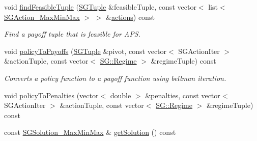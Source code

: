 \begin{DoxyCompactItemize}
\item 
\mbox{\label{classSGSolver__MaxMinMax_ae6d741e78d80171428a81e9933ebf76f}} 
void \hyperlink{classSGSolver__MaxMinMax_ae6d741e78d80171428a81e9933ebf76f}{find\+Feasible\+Tuple} (\hyperlink{classSGTuple}{S\+G\+Tuple} \&feasible\+Tuple, const vector$<$ list$<$ \hyperlink{classSGAction__MaxMinMax}{S\+G\+Action\+\_\+\+Max\+Min\+Max} $>$ $>$ \&\hyperlink{classSGSolver__MaxMinMax_ad1a4bf22aaa58dd05c7bc7a24d9c1805}{actions}) const
\begin{DoxyCompactList}\small\item\em Find a payoff tuple that is feasible for A\+PS. \end{DoxyCompactList}\item 
\mbox{\label{classSGSolver__MaxMinMax_a108b44872ab1a77b8013d898c19b2005}} 
void \hyperlink{classSGSolver__MaxMinMax_a108b44872ab1a77b8013d898c19b2005}{policy\+To\+Payoffs} (\hyperlink{classSGTuple}{S\+G\+Tuple} \&pivot, const vector$<$ S\+G\+Action\+Iter $>$ \&action\+Tuple, const vector$<$ \hyperlink{namespaceSG_a139e4dec41ea0f38aae1f93f60cfff60}{S\+G\+::\+Regime} $>$ \&regime\+Tuple) const
\begin{DoxyCompactList}\small\item\em Converts a policy function to a payoff function using bellman iteration. \end{DoxyCompactList}\item 
void \hyperlink{classSGSolver__MaxMinMax_a66a941fb8232a6cd7d017aab2bc34ed2}{policy\+To\+Penalties} (vector$<$ double $>$ \&penalties, const vector$<$ S\+G\+Action\+Iter $>$ \&action\+Tuple, const vector$<$ \hyperlink{namespaceSG_a139e4dec41ea0f38aae1f93f60cfff60}{S\+G\+::\+Regime} $>$ \&regime\+Tuple) const
\item 
const \hyperlink{classSGSolution__MaxMinMax}{S\+G\+Solution\+\_\+\+Max\+Min\+Max} \& \hyperlink{classSGSolver__MaxMinMax_ab8475d7043987a535dcadf3db3044aba}{get\+Solution} () const
\end{DoxyCompactItemize}
